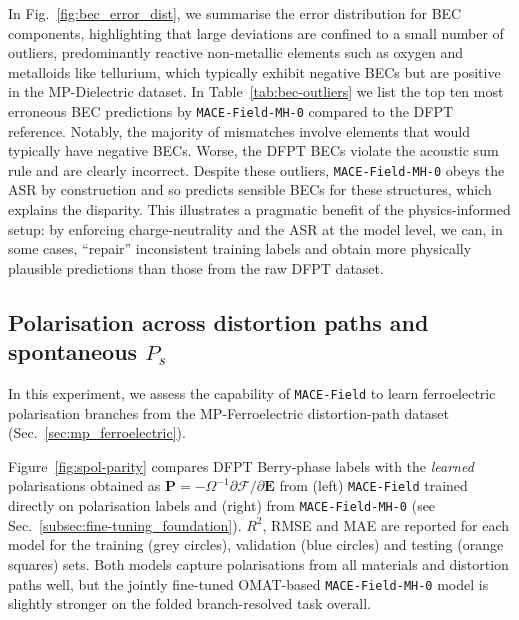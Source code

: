 \documentclass[aps,physrev,graphicx,amsmath,amssymb,
               reprint,superscriptaddress]{revtex4-2}
\begin{document}
In Fig.~\ref{fig:bec_error_dist}, we summarise the error distribution for BEC components, highlighting that large deviations are confined to a small number of outliers, predominantly reactive non-metallic elements such as oxygen and metalloids like tellurium, which typically exhibit negative BECs but are positive in the MP-Dielectric dataset. In Table~\ref{tab:bec-outliers} we list the top ten most erroneous BEC predictions by \texttt{MACE-Field-MH-0} compared to the DFPT reference. Notably, the majority of mismatches involve elements that would typically have negative BECs. Worse, the DFPT BECs violate the acoustic sum rule and are clearly incorrect. Despite these outliers, \texttt{MACE-Field-MH-0} obeys the ASR by construction and so predicts sensible BECs for these structures, which explains the disparity. This illustrates a pragmatic benefit of the physics-informed setup: by enforcing charge-neutrality and the ASR at the model level, we can, in some cases, ``repair'' inconsistent training labels and obtain more physically plausible predictions than those from the raw DFPT dataset.

\begin{table}[t]
  \centering
  
  \caption{\textbf{Top 10 BEC outliers by material.} Largest erroneous BEC predictions (unit of \si{e}) by the fine-tuned \texttt{MACE-Field} model. The first listed element has the largest difference between the MP-Dielectric reference values and the \texttt{MACE-Field} prediction. The second and third elements' BECs in the material are then listed. Notably, all of these outliers correspond to clearly incorrect BECs in the MP-Dielectric dataset; this is most evident from the fact that they do not obey the acoustic sum rule (ASR). The \texttt{MACE-Field} predictions do obey the ASR and give sensible BECs.}
  \label{tab:bec-outliers}
\end{table}

\subsection{Polarisation across distortion paths and spontaneous $P_s$}
\label{subsection:polarisation_branches}

In this experiment, we assess the capability of \texttt{MACE-Field} to learn ferroelectric polarisation branches from the MP-Ferroelectric distortion-path dataset (Sec.~\ref{sec:mp_ferroelectric}). 

Figure~\ref{fig:spol-parity} compares DFPT Berry-phase labels with the \emph{learned} polarisations obtained as 
$\mathbf P=-\Omega^{-1}\partial\mathcal F/\partial\mathbf E$ from (left) \texttt{MACE-Field} trained directly on polarisation labels and (right) from \texttt{MACE-Field-MH-0} (see Sec.~\ref{subsec:fine-tuning_foundation}). $R^2$, RMSE and MAE are reported for each model for the training (grey circles), validation (blue circles) and testing (orange squares) sets. Both models capture polarisations from all materials and distortion paths well, but the jointly fine-tuned OMAT-based \texttt{MACE-Field-MH-0} model is slightly stronger on the folded branch-resolved task overall.
\end{document}
